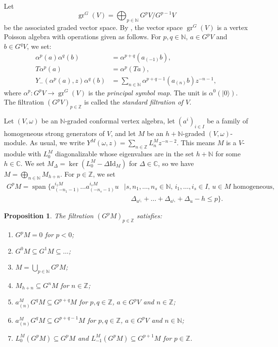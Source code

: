 \documentclass[a4paper, 12pt, reqno]{amsart}
\newtheorem{proposition}[theorem]{Proposition}
\theoremstyle{remark}
\DeclareMathOperator{\gr}{gr}
\DeclareMathOperator{\vspan}{span}
\newcommand{\vac}{{|0\rangle}}
\newcommand{\Id}{{\mathrm{Id}}}
\begin{document}
Let
\begin{equation*}
  \gr^G(V) = \bigoplus_{p \in \mathbb{N}}G^pV/G^{p - 1}V
\end{equation*}
be the associated graded vector space.
By \cite{li_vertex_2004}, the vector space $\gr^G(V)$ is a vertex Poisson algebra with operations given as follows.
For $p, q \in \mathbb{N}$, $a \in G^pV$ and $b \in G^qV$, we set:
\begin{align*}
  \alpha^p(a)\alpha^q(b) &= \alpha^{p + q}(a_{(-1)}b), \\
  T\alpha^p(a) &= \alpha^p(Ta), \\
  Y_-(\alpha^p(a), z)\alpha^q(b) &= \sum_{n \in \mathbb{N}}\alpha^{p + q - 1}(a_{(n)}b)z^{-n - 1},
\end{align*}
where $\alpha^p: G^pV \to \gr^G(V)$ is the \emph{principal symbol map}.
The unit is $\alpha^0(\vac)$.
The filtration $(G^pV)_{p \in \mathbb{Z}}$ is called the \emph{standard filtration of $V$}.

Let $(V, \omega)$ be an $\mathbb{N}$-graded conformal vertex algebra, let $(a^i)_{i \in I}$ be a family of homogeneous strong generators of $V$, and let $M$ be an $h + \mathbb{N}$-graded $(V, \omega)$-module.
As usual, we write $Y^M(\omega, z) = \sum_{n \in \mathbb{Z}}L^M_nz^{-n - 2}$.
This means $M$ is a $V$-module with $L_0^M$ diagonalizable whose eigenvalues are in the set $h + \mathbb{N}$ for some $h \in \mathbb{C}$.
We set $M_{\Delta} = \ker(L^M_0 - \Delta\Id_M)$ for $\Delta \in \mathbb{C}$, so we have $M = \bigoplus_{n \in \mathbb{N}}M_{h + n}$.
For $p \in \mathbb{Z}$, we set
\begin{equation*}
  \begin{split}
    G^pM = \vspan\{a^{i_1M}_{(-n_1 - 1)}\dots a^{i_sM}_{(-n_s - 1)}u &\mid \text{$s, n_1, \dots, n_s \in \mathbb{N}$, $i_1, \dots, i_s \in I$, $u \in M$ homogeneous,} \\
                                                                     &\quad \Delta_{a^{i_1}} + \dots + \Delta_{a^{i_s}} + \Delta_u - h \le p\}.
  \end{split}
\end{equation*}

\begin{proposition}
  \label{prp:2}
  The filtration $(G^pM)_{p \in \mathbb{Z}}$ satisfies:
  \begin{enumerate}
  \item $G^pM = 0$ for $p < 0$;
  \item $G^0M \subseteq G^1M \subseteq \dots$;
  \item $M = \bigcup_{p \in \mathbb{N}}G^pM$;
  \item $M_{h + n} \subseteq G^nM$ for $n \in \mathbb{Z}$;
  \item $a^M_{(n)}G^qM \subseteq G^{p + q}M$ for $p, q \in \mathbb{Z}$, $a \in G^pV$ and $n \in \mathbb{Z}$;
  \item $a^M_{(n)}G^qM \subseteq G^{p + q - 1}M$ for $p, q \in \mathbb{Z}$, $a \in G^pV$ and $n \in \mathbb{N}$;
  \item $L^M_0(G^pM) \subseteq G^pM$ and $L^M_{-1}(G^pM) \subseteq G^{p + 1}M$ for $p \in \mathbb{Z}$.
  \end{enumerate}
\end{proposition}
\end{document}
